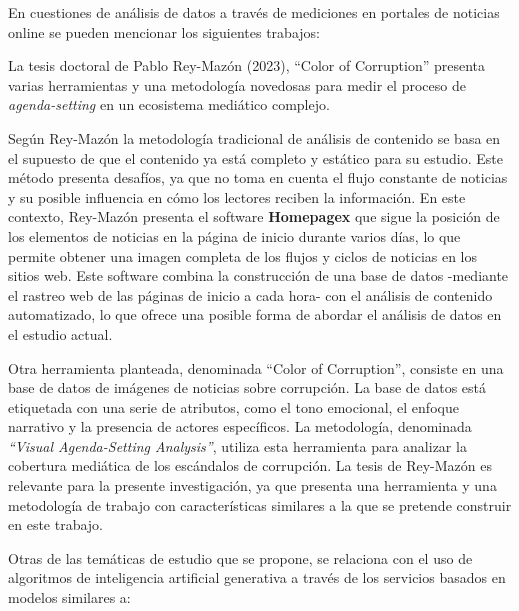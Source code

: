 \documentclass[12pt]{article}
\begin{document}

En cuestiones de análisis de datos a través de mediciones en portales de noticias online se pueden mencionar los siguientes trabajos:

La tesis doctoral de Pablo Rey-Mazón (2023), ``Color of Corruption'' \cite{mazon:2023} presenta varias herramientas y una metodología novedosas para medir el proceso de \textit{agenda-setting} en un ecosistema mediático complejo.

Según Rey-Mazón la metodología tradicional de análisis de contenido se basa en el supuesto de que el contenido ya está completo y estático para su estudio. Este método presenta desafíos, ya que no toma en cuenta el flujo constante de noticias y su posible influencia en cómo los lectores reciben la información. En este contexto, Rey-Mazón presenta el software \textbf{Homepagex} que sigue la posición de los elementos de noticias en la página de inicio durante varios días, lo que permite obtener una imagen completa de los flujos y ciclos de noticias en los sitios web. Este software combina la construcción de una base de datos -mediante el rastreo web de las páginas de inicio a cada hora- con el análisis de contenido automatizado, lo que ofrece una posible forma de abordar el análisis de datos en el estudio actual.

Otra herramienta planteada, denominada ``Color of Corruption'', consiste en una base de datos de imágenes de noticias sobre corrupción. La base de datos está etiquetada con una serie de atributos, como el tono emocional, el enfoque narrativo y la presencia de actores específicos. La metodología, denominada \textit{``Visual Agenda-Setting Analysis''}, utiliza esta herramienta para analizar la cobertura mediática de los escándalos de corrupción. La tesis de Rey-Mazón es relevante para la presente investigación, ya que presenta una herramienta y una metodología de trabajo con características similares a la que se pretende construir en este trabajo. 



Otras de las temáticas de estudio que se propone, se relaciona con el uso de algoritmos de inteligencia artificial generativa a través de los servicios basados en modelos similares a:  
\end{document}
